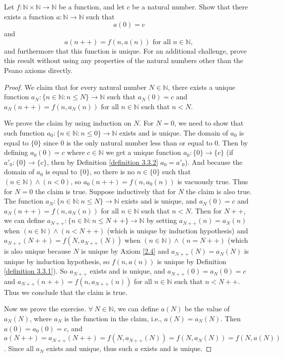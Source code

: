 \begin{exercise}\label{exercise 3.5.12}
Let \(f : \mathds{N} \times \mathds{N} \to \mathds{N}\) be a function, and let \(c\) be a natural number.
Show that there exists a function \(a : \mathds{N} \to \mathds{N}\) such that
\[
    a(0) = c
\]
and
\[
    a(n++) = f(n, a(n)) \text{ for all } n \in \mathds{N},
\]
and furthermore that this function is unique.
For an additional challenge, prove this result without using any properties of the natural numbers other than the Peano axioms directly.
\end{exercise}

\begin{proof}
We claim that for every natural number \(N \in \mathds{N}\), there exists a unique function \(a_N : \{n \in \mathds{N} : n \leq N\} \to \mathds{N}\) such that \(a_N(0) = c\) and \(a_N(n++) = f(n, a_{N}(n))\) for all \(n \in \mathds{N}\) such that \(n < N\).

We prove the claim by using induction on \(N\).
For \(N = 0\), we need to show that such function \(a_0 : \{n \in \mathds{N} : n \leq 0\} \to \mathds{N}\) exists and is unique.
The domain of \(a_0\) is equal to \(\{0\}\) since \(0\) is the only natural number less than or equal to \(0\).
Then by defining \(a_0(0) = c\) where \(c \in \mathds{N}\) we get a unique function \(a_0 : \{0\} \to \{c\}\) (if \(a'_0 : \{0\} \to \{c\}\), then by Definition \ref{definition 3.3.2} \(a_0 = a'_0\)).
And because the domain of \(a_0\) is equal to \(\{0\}\), so there is no \(n \in \{0\}\) such that \((n \in \mathds{N}) \land (n < 0)\), so \(a_0(n++) = f(n, a_0(n))\) is vacuously true.
Thus for \(N = 0\) the claim is true.
Suppose inductively that for \(N\) the claim is also true.
The function \(a_N : \{n \in \mathds{N} : n \leq N\} \to \mathds{N}\) exists and is unique, and \(a_N(0) = c\) and \(a_N(n++) = f(n, a_N(n))\) for all \(n \in \mathds{N}\) such that \(n < N\).
Then for \(N++\), we can define \(a_{N++} : \{n \in \mathds{N} : n \leq N++\} \to \mathds{N}\) by setting \(a_{N++}(n) = a_N(n)\) when \((n \in \mathds{N}) \land (n < N++)\) (which is unique by induction hypothesis) and \(a_{N++}(N++) = f(N, a_{N++}(N))\) when \((n \in \mathds{N}) \land (n = N++)\) (which is also unique because \(N\) is unique by Axiom \ref{2.4} and \(a_{N++}(N) = a_N(N)\) is unique by induction hypothesis, so \(f(n, a(n))\) is unique by Definition \ref{definition 3.3.1}).
So \(a_{N++}\) exists and is unique, and \(a_{N++}(0) = a_N(0) = c\) and \(a_{N++}(n++) = f(n, a_{N++}(n))\) for all \(n \in \mathds{N}\) such that \(n < N++\).
Thus we conclude that the claim is true.

Now we prove the exercise.
\(\forall\ N \in \mathds{N}\), we can define \(a(N)\) be the value of \(a_N(N)\), where \(a_N\) is the function in the claim, i.e., \(a(N) = a_{N}(N)\).
Then \(a(0) = a_0(0) = c\), and \(a(N++) = a_{N++}(N++) = f(N, a_{N++}(N)) = f(N, a_{N}(N)) = f(N, a(N))\).
Since all \(a_N\) exists and unique, thus such \(a\) exists and is unique.
\end{proof}

